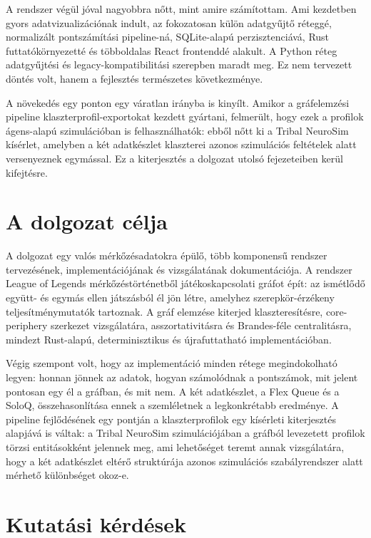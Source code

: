 A rendszer végül jóval nagyobbra nőtt, mint amire számítottam. Ami kezdetben gyors adatvizualizációnak indult, az fokozatosan külön adatgyűjtő réteggé, normalizált pontszámítási pipeline-ná, SQLite-alapú perzisztenciává, Rust futtatókörnyezetté és többoldalas React frontenddé alakult. A Python réteg adatgyűjtési és legacy-kompatibilitási szerepben maradt meg. Ez nem tervezett döntés volt, hanem a fejlesztés természetes következménye.

A növekedés egy ponton egy váratlan irányba is kinyílt. Amikor a gráfelemzési pipeline klaszterprofil-exportokat kezdett gyártani, felmerült, hogy ezek a profilok ágens-alapú szimulációban is felhasználhatók: ebből nőtt ki a Tribal NeuroSim kísérlet, amelyben a két adatkészlet klaszterei azonos szimulációs feltételek alatt versenyeznek egymással. Ez a kiterjesztés a dolgozat utolsó fejezeteiben kerül kifejtésre.

\section{A dolgozat célja}

A dolgozat egy valós mérkőzésadatokra épülő, több komponensű rendszer tervezésének, implementációjának és vizsgálatának dokumentációja. A rendszer League of Legends mérkőzéstörténetből játékoskapcsolati gráfot épít: az ismétlődő együtt- és egymás ellen játszásból él jön létre, amelyhez szerepkör-érzékeny teljesítménymutatók tartoznak. A gráf elemzése kiterjed klaszteresítésre, core-periphery szerkezet vizsgálatára, asszortativitásra és Brandes-féle centralitásra, mindezt Rust-alapú, determinisztikus és újrafuttatható implementációban.

Végig szempont volt, hogy az implementáció minden rétege megindokolható legyen: honnan jönnek az adatok, hogyan számolódnak a pontszámok, mit jelent pontosan egy él a gráfban, és mit nem. A két adatkészlet, a Flex Queue és a SoloQ, összehasonlítása ennek a szemléletnek a legkonkrétabb eredménye. A pipeline fejlődésének egy pontján a klaszterprofilok egy kísérleti kiterjesztés alapjává is váltak: a Tribal NeuroSim szimulációjában a gráfból levezetett profilok törzsi entitásokként jelennek meg, ami lehetőséget teremt annak vizsgálatára, hogy a két adatkészlet eltérő struktúrája azonos szimulációs szabályrendszer alatt mérhető különbséget okoz-e.

\section{Kutatási kérdések}

